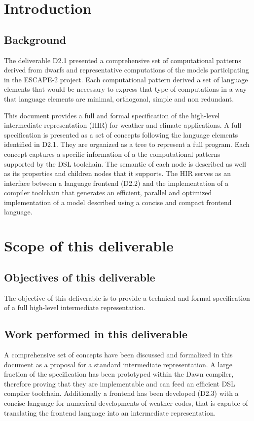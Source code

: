 \section{Introduction}

\subsection{Background}
The deliverable D2.1 presented a comprehensive 
set of computational patterns derived from dwarfs and representative 
computations of the models participating in the ESCAPE-2 project.
Each computational pattern derived a set of language elements
that would be necessary to express that type of computations
in a way that language elements are minimal, orthogonal, simple 
and non redundant. 

This document provides a full and formal specification of 
the high-level intermediate representation (HIR) for weather and climate applications.
A full specification is presented as a set of concepts following
the language elements identified in D2.1. They
are organized as a tree to represent a full program. 
Each concept captures a specific information of a the computational
patterns supported by the DSL toolchain.
The semantic of each node is described as well as its properties 
and children nodes that it supports. 
The HIR serves as an interface between a language frontend (D2.2)
and the implementation of a compiler toolchain that
generates an efficient, parallel and optimized implementation 
of a model described using a concise and compact frontend language. 


\section{Scope of this deliverable}
\subsection{Objectives of this deliverable} 
The objective of this deliverable is to provide a technical 
and formal specification of a full high-level intermediate
representation.
\subsection{Work performed in this deliverable} 
A comprehensive set of concepts have been discussed and formalized
in this document as a proposal for a standard intermediate representation. 
A large fraction of the specification has been prototyped within
the Dawn compiler, therefore proving that they are implementable and
can feed an efficient DSL compiler toolchain. 
Additionally a frontend has been developed (D2.3) with a concise
language for numerical developments of weather codes, that is
capable of translating the frontend language into an intermediate 
representation. 
